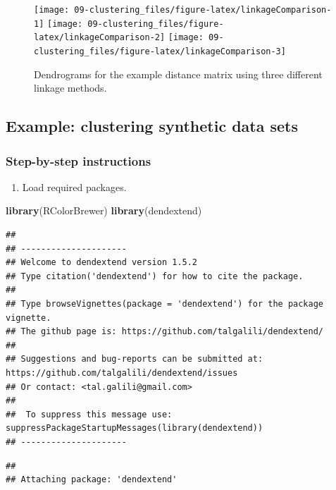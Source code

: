 \documentclass[]{book}
\newenvironment{Shaded}{\begin{snugshade}}{\end{snugshade}}
\newcommand{\KeywordTok}[1]{\textcolor[rgb]{0.13,0.29,0.53}{\textbf{{#1}}}}
\newcommand{\NormalTok}[1]{{#1}}
\providecommand{\tightlist}{%
  \setlength{\itemsep}{0pt}\setlength{\parskip}{0pt}}
\theoremstyle{definition}
\theoremstyle{definition}
\theoremstyle{definition}
\theoremstyle{remark}
\begin{document}
\begin{figure}

{\centering \texttt{[image: 09-clustering\_files/figure-latex/linkageComparison-1]} \texttt{[image: 09-clustering\_files/figure-latex/linkageComparison-2]} \texttt{[image: 09-clustering\_files/figure-latex/linkageComparison-3]} 

}

\caption{Dendrograms for the example distance matrix using three different linkage methods. }\label{fig:linkageComparison}
\end{figure}

\subsection{Example: clustering synthetic data
sets}\label{example-clustering-synthetic-data-sets}

\subsubsection{Step-by-step
instructions}\label{step-by-step-instructions}

\begin{enumerate}
\def\labelenumi{\arabic{enumi}.}
\tightlist
\item
  Load required packages.
\end{enumerate}

\begin{Shaded}
\begin{Highlighting}[]
\KeywordTok{library}\NormalTok{(RColorBrewer)}
\KeywordTok{library}\NormalTok{(dendextend)}
\end{Highlighting}
\end{Shaded}

\begin{verbatim}
## 
## ---------------------
## Welcome to dendextend version 1.5.2
## Type citation('dendextend') for how to cite the package.
## 
## Type browseVignettes(package = 'dendextend') for the package vignette.
## The github page is: https://github.com/talgalili/dendextend/
## 
## Suggestions and bug-reports can be submitted at: https://github.com/talgalili/dendextend/issues
## Or contact: <tal.galili@gmail.com>
## 
##  To suppress this message use:  suppressPackageStartupMessages(library(dendextend))
## ---------------------
\end{verbatim}

\begin{verbatim}
## 
## Attaching package: 'dendextend'
\end{verbatim}
\end{document}
